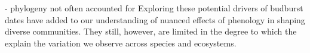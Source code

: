 \documentclass{article}\usepackage[]{graphicx}\usepackage[]{color}
\begin{document}
- phylogeny not often accounted for 
Exploring these potential drivers of budburst dates have added to our understanding of nuanced effects of phenology in shaping diverse communities. They still, however, are limited in the degree to which the explain the variation we observe across species and ecosystems.
\end{document}
